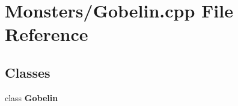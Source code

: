\section{Monsters/\-Gobelin.cpp File Reference}
\label{_gobelin_8cpp}
\subsection*{Classes}
\begin{DoxyCompactItemize}
\item 
class {\bf Gobelin}
\end{DoxyCompactItemize}

